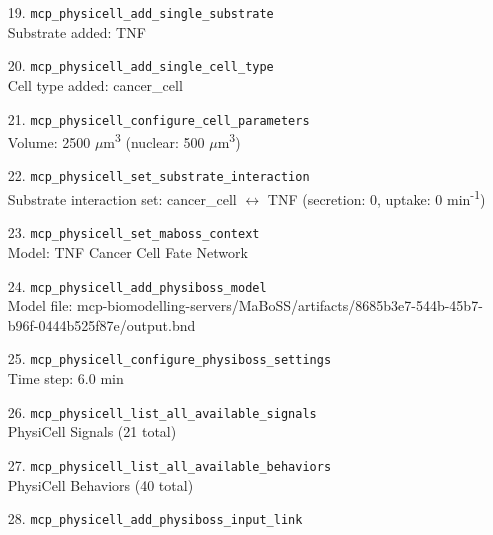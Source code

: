 \begin{enumerate}
\RaggedRight Domain: 2000.0\times{}2000.0 \ensuremath{\mu}m (z = 20.0 \ensuremath{\mu}m, one voxel)
\item[19.] \texttt{mcp\_\allowbreak{}physicell\_\allowbreak{}add\_\allowbreak{}single\_\allowbreak{}substrate}
\hfill\\
\RaggedRight Substrate added: TNF
\item[20.] \texttt{mcp\_\allowbreak{}physicell\_\allowbreak{}add\_\allowbreak{}single\_\allowbreak{}cell\_\allowbreak{}type}
\hfill\\
\RaggedRight Cell type added: cancer\_cell
\item[21.] \texttt{mcp\_\allowbreak{}physicell\_\allowbreak{}configure\_\allowbreak{}cell\_\allowbreak{}parameters}
\hfill\\
\RaggedRight Volume: 2500 \ensuremath{\mu}m\textsuperscript{3} (nuclear: 500 \ensuremath{\mu}m\textsuperscript{3})
\item[22.] \texttt{mcp\_\allowbreak{}physicell\_\allowbreak{}set\_\allowbreak{}substrate\_\allowbreak{}interaction}
\hfill\\
\RaggedRight Substrate interaction set: cancer\_cell \ensuremath{\leftrightarrow} TNF (secretion: 0, uptake: 0 min\textsuperscript{-}\textsuperscript{1})
\item[23.] \texttt{mcp\_\allowbreak{}physicell\_\allowbreak{}set\_\allowbreak{}maboss\_\allowbreak{}context}
\hfill\\
\RaggedRight Model: TNF Cancer Cell Fate Network
\item[24.] \texttt{mcp\_\allowbreak{}physicell\_\allowbreak{}add\_\allowbreak{}physiboss\_\allowbreak{}model}
\hfill\\
\RaggedRight Model file: mcp-biomodelling-servers/MaBoSS/artifacts/8685b3e7-544b-45b7-b96f-0444b525f87e/output.bnd
\item[25.] \texttt{mcp\_\allowbreak{}physicell\_\allowbreak{}configure\_\allowbreak{}physiboss\_\allowbreak{}settings}
\hfill\\
\RaggedRight Time step: 6.0 min
\item[26.] \texttt{mcp\_\allowbreak{}physicell\_\allowbreak{}list\_\allowbreak{}all\_\allowbreak{}available\_\allowbreak{}signals}
\hfill\\
\RaggedRight PhysiCell Signals (21 total)
\item[27.] \texttt{mcp\_\allowbreak{}physicell\_\allowbreak{}list\_\allowbreak{}all\_\allowbreak{}available\_\allowbreak{}behaviors}
\hfill\\
\RaggedRight PhysiCell Behaviors (40 total)
\item[28.] \texttt{mcp\_\allowbreak{}physicell\_\allowbreak{}add\_\allowbreak{}physiboss\_\allowbreak{}input\_\allowbreak{}link}

\end{enumerate}
